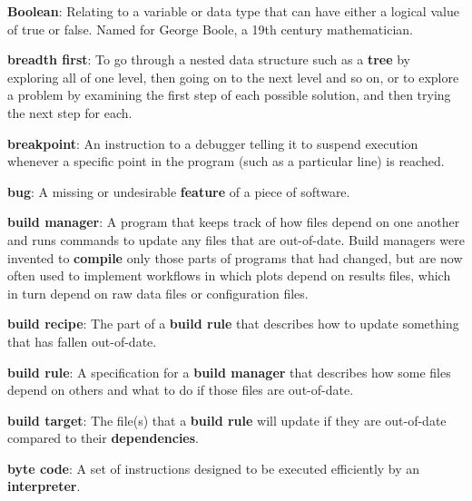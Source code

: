 \documentclass[krantzl]{krantz}
\newcommand{\glosskey}[1]{\textbf{#1}}
\begin{document}
\noindent \textbf{{\newline}\glosskey{Boolean}}: 
Relating to a variable or data type that can have either a logical value of true or false. Named for George Boole, a 19th century mathematician.


\noindent \textbf{{\newline}\glosskey{breadth first}}: 
To go through a nested data structure such as a \glosskey{tree} by exploring all of one level, then going on to the next level and so on, or to explore a problem by examining the first step of each possible solution, and then trying the next step for each.


\noindent \textbf{{\newline}\glosskey{breakpoint}}: 
An instruction to a debugger telling it to suspend execution whenever a specific point in the program (such as a particular line) is reached.


\noindent \textbf{{\newline}\glosskey{bug}}: 
A missing or undesirable \glosskey{feature} of a piece of software.


\noindent \textbf{{\newline}\glosskey{build manager}}: 
A program that keeps track of how files depend on one another and runs commands to update any files that are out-of-date. Build managers were invented to \glosskey{compile} only those parts of programs that had changed, but are now often used to implement workflows in which plots depend on results files, which in turn depend on raw data files or configuration files.


\noindent \textbf{{\newline}\glosskey{build recipe}}: 
The part of a \glosskey{build rule} that describes how to update something that has fallen out-of-date.


\noindent \textbf{{\newline}\glosskey{build rule}}: 
A specification for a \glosskey{build manager} that describes how some files depend on others and what to do if those files are out-of-date.


\noindent \textbf{{\newline}\glosskey{build target}}: 
The file(s) that a \glosskey{build rule} will update if they are out-of-date compared to their \glosskey{dependencies}.


\noindent \textbf{{\newline}\glosskey{byte code}}: 
A set of instructions designed to be executed efficiently by an \glosskey{interpreter}.
\end{document}
